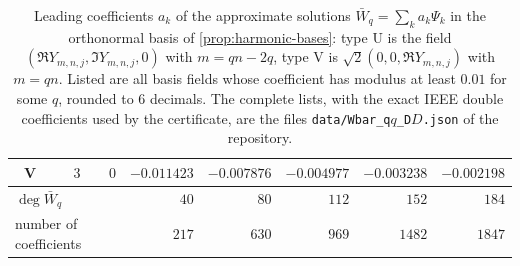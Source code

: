 \begin{table}[H]
\begin{tabular}{crrrrrrr}
V & $3$ & $0$ & $-0.011423$ & $-0.007876$ & $-0.004977$ & $-0.003238$ & $-0.002198$\\
\midrule
\multicolumn{3}{l}{$\deg\bar W_q$} & $40$ & $80$ & $112$ & $152$ & $184$\\
\multicolumn{3}{l}{number of coefficients} & $217$ & $630$ & $969$ & $1482$ & $1847$\\
\bottomrule
\end{tabular}
\caption{Leading coefficients $a_k$ of the approximate solutions $\bar W_q=\sum_k a_k\Psi_k$ in the orthonormal basis of \cref{prop:harmonic-bases}: type U is the field $(\Re Y_{m,n,j},\Im Y_{m,n,j},0)$ with $m=qn-2q$, type V is $\sqrt2(0,0,\Re Y_{m,n,j})$ with $m=qn$. Listed are all basis fields whose coefficient has modulus at least $0.01$ for some $q$, rounded to 6 decimals. The complete lists, with the exact IEEE double coefficients used by the certificate, are the files \texttt{data/Wbar\_q$q$\_D$D$.json} of the repository.}
\label{tab:coefficients}
\end{table}
